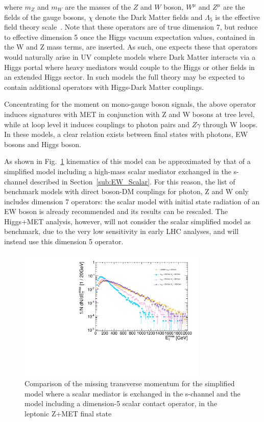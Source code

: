where $m_Z$ and $m_W$ are the masses of the $Z$ and $W$ boson, $W^{\mu}$ and $Z^{\mu}$
are the fields of the gauge bosons, $\chi$ denote the Dark Matter fields
and $\Lambda_5$ is the effective field theory scale~. Note that these operators are of true dimension 7, 
but reduce to effective dimension 5 once the Higgs vacuum expectation values, 
contained in the W and Z mass terms, are inserted.  
As such, one expects  these that operators would naturally arise in UV complete models where Dark Matter 
interacts via a Higgs portal where heavy mediators would couple to the Higgs or other fields in an extended Higgs sector. 
In such models the full theory may be expected to contain additional operators with Higgs-Dark Matter couplings. 

Concentrating  for the moment on mono-gauge boson signals, the above operator induces signatures with 
MET in conjunction with Z and W bosons at tree level,
while at loop level it induces couplings to photon pairs and $Z \gamma$ through W loops.
In these models, a clear relation exists between final states with photons, EW bosons
and Higgs boson. 

As shown in Fig.~\ref{fig:EW_EFT5_Zlep_MET}
kinematics of this model can be approximated by that of a simplified model including 
a high-mass scalar mediator exchanged in the s-channel described in Section~\ref{sub:EW_Scalar}. 
For this reason, the list of benchmark models with direct boson-DM couplings for photon, Z and W 
only includes dimension 7 operators: the scalar model with initial state radiation of an EW boson
is already recommended and its results can be rescaled. The Higgs+MET analysis,
however, will not consider the scalar simplified model as benchmark, due to the very low sensitivity 
in early LHC analyses, and will instead use this dimension 5 operator. 

\begin{figure}
	\includegraphics[width=0.8\textwidth]{figures/EW/pt_vv2_xxDHDH_vs_ScalarMediator.pdf}
	\caption{Comparison of the missing transverse momentum for the simplified model
		where a scalar mediator is exchanged in the s-channel and the model including 
		a dimension-5 scalar contact operator, in the leptonic Z+MET final state}
	\label{fig:EW_EFT5_Zlep_MET}
\end{figure}

